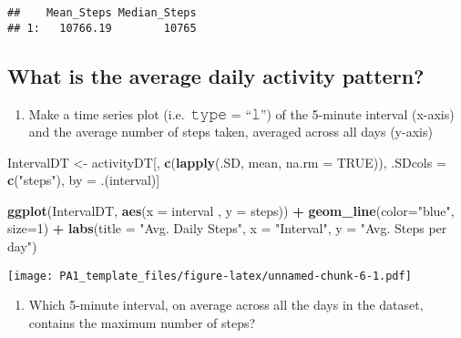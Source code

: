 \documentclass[
]{article}
\newenvironment{Shaded}{\begin{snugshade}}{\end{snugshade}}
\newcommand{\DataTypeTok}[1]{\textcolor[rgb]{0.13,0.29,0.53}{#1}}
\newcommand{\DecValTok}[1]{\textcolor[rgb]{0.00,0.00,0.81}{#1}}
\newcommand{\KeywordTok}[1]{\textcolor[rgb]{0.13,0.29,0.53}{\textbf{#1}}}
\newcommand{\NormalTok}[1]{#1}
\newcommand{\OperatorTok}[1]{\textcolor[rgb]{0.81,0.36,0.00}{\textbf{#1}}}
\newcommand{\OtherTok}[1]{\textcolor[rgb]{0.56,0.35,0.01}{#1}}
\newcommand{\StringTok}[1]{\textcolor[rgb]{0.31,0.60,0.02}{#1}}
\providecommand{\tightlist}{%
  \setlength{\itemsep}{0pt}\setlength{\parskip}{0pt}}
\begin{document}
\begin{verbatim}
##    Mean_Steps Median_Steps
## 1:   10766.19        10765
\end{verbatim}

\hypertarget{what-is-the-average-daily-activity-pattern}{%
\subsection{What is the average daily activity
pattern?}\label{what-is-the-average-daily-activity-pattern}}

\begin{enumerate}
\def\labelenumi{\arabic{enumi}.}
\tightlist
\item
  Make a time series plot (i.e.~𝚝𝚢𝚙𝚎 = ``𝚕'') of the 5-minute interval
  (x-axis) and the average number of steps taken, averaged across all
  days (y-axis)
\end{enumerate}

\begin{Shaded}
\begin{Highlighting}[]
\NormalTok{IntervalDT <-}\StringTok{ }\NormalTok{activityDT[, }\KeywordTok{c}\NormalTok{(}\KeywordTok{lapply}\NormalTok{(.SD, mean, }\DataTypeTok{na.rm =} \OtherTok{TRUE}\NormalTok{)), .SDcols =}\StringTok{ }\KeywordTok{c}\NormalTok{(}\StringTok{"steps"}\NormalTok{), by =}\StringTok{ }\NormalTok{.(interval)] }

\KeywordTok{ggplot}\NormalTok{(IntervalDT, }\KeywordTok{aes}\NormalTok{(}\DataTypeTok{x =}\NormalTok{ interval , }\DataTypeTok{y =}\NormalTok{ steps)) }\OperatorTok{+}\StringTok{ }\KeywordTok{geom_line}\NormalTok{(}\DataTypeTok{color=}\StringTok{"blue"}\NormalTok{, }\DataTypeTok{size=}\DecValTok{1}\NormalTok{) }\OperatorTok{+}\StringTok{ }\KeywordTok{labs}\NormalTok{(}\DataTypeTok{title =} \StringTok{"Avg. Daily Steps"}\NormalTok{, }\DataTypeTok{x =} \StringTok{"Interval"}\NormalTok{, }\DataTypeTok{y =} \StringTok{"Avg. Steps per day"}\NormalTok{)}
\end{Highlighting}
\end{Shaded}

\texttt{[image: PA1\_template\_files/figure-latex/unnamed-chunk-6-1.pdf]}

\begin{enumerate}
\def\labelenumi{\arabic{enumi}.}
\setcounter{enumi}{1}
\tightlist
\item
  Which 5-minute interval, on average across all the days in the
  dataset, contains the maximum number of steps?
\end{enumerate}
\end{document}
